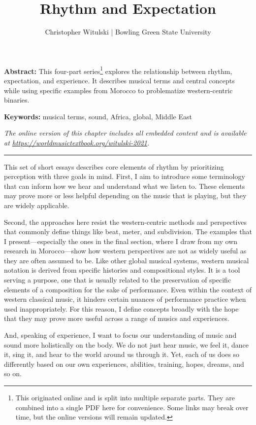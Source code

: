 \documentclass[twoside]{article}
\title{Rhythm and Expectation}
\author{Christopher Witulski | Bowling Green State University}
\date{}
\makeatletter
\renewcommand{\maketitle}{\bgroup\setlength{\parindent}{0pt}
\begin{flushleft}
  \vspace*{3\baselineskip}
  \huge{\textbf{\@title}}

  \medskip
  
  \large{\@author}
\end{flushleft}\egroup
}
\providecommand{\abstracttext}[1]
{
  \noindent
  \textbf{Abstract:} #1
}
\providecommand{\keywords}[1]
{
  \newline
  \textbf{Keywords:} #1
}
\providecommand{\wmturl}{\href{https://worldmusictextbook.org/witulski-2021}{https://worldmusictextbook.org/witulski-2021}}
\providecommand{\wmturltext}{
  \noindent\emph{The online version of this chapter includes all embedded content and is available at \wmturl.}
}
\makeatother
\begin{document}
\suppressfloats %
\maketitle

\abstracttext{This four-part series\footnote{This originated online and is split into multiple separate parts. They are combined into a single PDF here for convenience. Some links may break over time, but the online versions will remain updated.} explores the relationship between rhythm, expectation, and experience. It describes musical terms and central concepts while using specific examples from Morocco to problematize western-centric binaries.}
\keywords{musical terms, sound, Africa, global, Middle East}

\smallskip

\wmturltext

\medskip

\noindent\hfil\rule{0.5\textwidth}{0.4pt}\hfil

\bigskip

This set of short essays describes core elements of rhythm by
prioritizing perception with three goals in mind. First, I aim to
introduce some terminology that can inform how we hear and understand
what we listen to. These elements may prove more or less helpful
depending on the music that is playing, but they are widely applicable.

Second, the approaches here resist the western-centric methods and
perspectives that commonly define things like beat, meter, and
subdivision. The examples that I present---especially the ones in the
final section, where I draw from my own research in Morocco---show how
western perspectives are not as widely useful as they are often assumed
to be. Like other global musical systems, western musical notation is
derived from specific histories and compositional styles. It is a tool
serving a purpose, one that is usually related to the preservation of
specific elements of a composition for the sake of performance. Even
within the context of western classical music, it hinders certain
nuances of performance practice when used inappropriately. For this
reason, I define concepts broadly with the hope that they may prove more
useful across a range of musics and experiences.

And, speaking of experience, I want to focus our understanding of music
and sound more holistically on the body. We do not just hear music, we
feel it, dance it, sing it, and hear to the world around us through it.
Yet, each of us does so differently based on our own experiences,
abilities, training, hopes, dreams, and so on.
\end{document}
